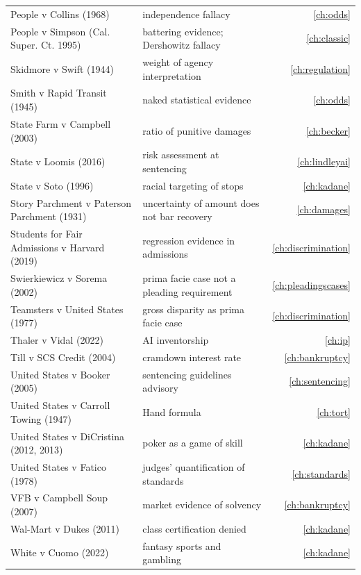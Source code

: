 \begin{longtable}{>{\raggedright\arraybackslash}p{3.7cm} >{\raggedright\arraybackslash}p{5.6cm} r}
People v Collins (1968) & independence fallacy & \ref{ch:odds}\\
People v Simpson (Cal. Super. Ct. 1995) & battering evidence; Dershowitz fallacy & \ref{ch:classic}\\
Skidmore v Swift (1944) & weight of agency interpretation & \ref{ch:regulation}\\
Smith v Rapid Transit (1945) & naked statistical evidence & \ref{ch:odds}\\
State Farm v Campbell (2003) & ratio of punitive damages & \ref{ch:becker}\\
State v Loomis (2016) & risk assessment at sentencing & \ref{ch:lindleyai}\\
State v Soto (1996) & racial targeting of stops & \ref{ch:kadane}\\
Story Parchment v Paterson Parchment (1931) & uncertainty of amount does not bar recovery & \ref{ch:damages}\\
Students for Fair Admissions v Harvard (2019) & regression evidence in admissions & \ref{ch:discrimination}\\
Swierkiewicz v Sorema (2002) & prima facie case not a pleading requirement & \ref{ch:pleadingscases}\\
Teamsters v United States (1977) & gross disparity as prima facie case & \ref{ch:discrimination}\\
Thaler v Vidal (2022) & AI inventorship & \ref{ch:ip}\\
Till v SCS Credit (2004) & cramdown interest rate & \ref{ch:bankruptcy}\\
United States v Booker (2005) & sentencing guidelines advisory & \ref{ch:sentencing}\\
United States v Carroll Towing (1947) & Hand formula & \ref{ch:tort}\\
United States v DiCristina (2012, 2013) & poker as a game of skill & \ref{ch:kadane}\\
United States v Fatico (1978) & judges' quantification of standards & \ref{ch:standards}\\
VFB v Campbell Soup (2007) & market evidence of solvency & \ref{ch:bankruptcy}\\
Wal-Mart v Dukes (2011) & class certification denied & \ref{ch:kadane}\\
White v Cuomo (2022) & fantasy sports and gambling & \ref{ch:kadane}\\
\bottomrule
\end{longtable}

